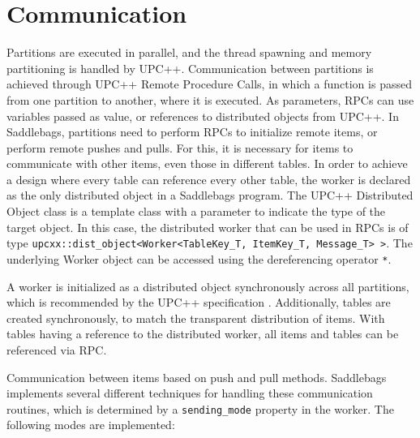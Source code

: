 \documentclass{uit-report}
\begin{document}


\section{Communication}
Partitions are executed in parallel, and the thread spawning and memory partitioning is handled by UPC++. Communication between partitions is achieved through UPC++ Remote Procedure Calls, in which a function is passed from one partition to another, where it is executed. As parameters, RPCs can use variables passed as value, or references to distributed objects from UPC++. In Saddlebags, partitions need to perform RPCs to initialize remote items, or perform remote pushes and pulls. For this, it is necessary for items to communicate with other items, even those in different tables. In order to achieve a design where every table can reference every other table, the worker is declared as the only distributed object in a Saddlebags program. The UPC++ Distributed Object class is a template class with a parameter to indicate the type of the target object. In this case, the distributed worker that can be used in RPCs is of type \texttt{upcxx::dist\_object<Worker<TableKey\_T, ItemKey\_T, Message\_T> >}. The underlying Worker object can be accessed using the dereferencing operator \texttt{*}.

A worker is initialized as a distributed object synchronously across all partitions, which is recommended by the UPC++ specification \cite{upc_language_specification}. Additionally, tables are created synchronously, to match the transparent distribution of items. With tables having a reference to the distributed worker, all items and tables can be referenced via RPC.

Communication between items based on push and pull methods. Saddlebags implements several different techniques for handling these communication routines, which is determined by a \texttt{sending\_mode} property in the worker. The following modes are implemented:
\end{document}
